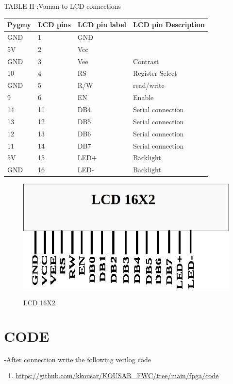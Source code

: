 \documentclass[twocolumn,13pt]{article}
\begin{document}
\begin{center}
    TABLE II :Vaman to LCD connections
\end{center}
 \begin{tabular}{ |p{1.5cm}|p{1.5cm}|p{1.5cm}|p{1.5cm}| }
 \hline
 \setlength{\tabcolsep}{3pt}
Pygmy & LCD pins & LCD pin label & LCD pin Description\\
\hline
 GND & 1& GND & \\
 \hline
 5V & 2 & Vcc &\\
 \hline
 GND & 3 & Vee & Contrast\\
 \hline
 10 & 4 & RS & Register Select\\
 \hline
 GND & 5 & R/W & read/write\\
 \hline
 9 & 6 & EN &Enable\\
 \hline
 14 & 11 & DB4 & Serial connection\\
 \hline
 13 & 12 & DB5 & Serial connection\\
 \hline
 12 & 13 & DB6 & Serial connection\\
 \hline
 11 & 14 & DB7 & Serial connection\\
 \hline
 5V & 15 & LED+ & Backlight\\
 \hline
 GND & 16 & LED- & Backlight\\
 \hline
\end{tabular}

\begin{figure}[h!]
\vspace{7cm}
\centering
\includegraphics[scale=0.5]{figs/lcd.png}   \\
\centering
\caption{LCD 16X2}
\end{figure}

\vspace{10 cm}

\section*{CODE}
-After connection write the following verilog code
\begin{enumerate}
\item \url{https://github.com/kkousar/KOUSAR_FWC/tree/main/fpga/code}
\end{enumerate}
\end{document}
